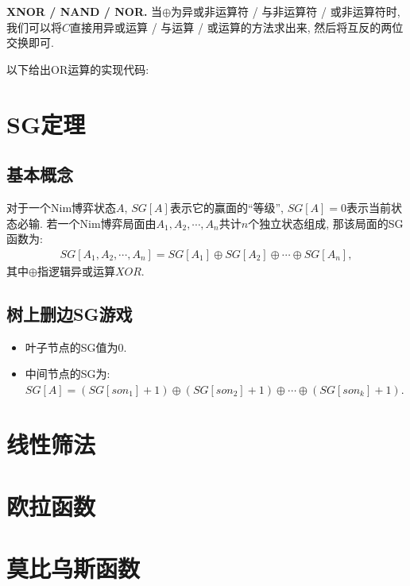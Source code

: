 \textbf{XNOR / NAND / NOR.}
当$\oplus$为异或非运算符 / 与非运算符 / 或非运算符时,我们可以将$C$直接用异或运算 / 与运算 / 或运算的方法求出来, 然后将互反的两位交换即可.

以下给出OR运算的实现代码:


\section{SG定理}

\subsection{基本概念}
对于一个Nim博弈状态$A$, $SG[A]$表示它的赢面的``等级'', $SG [A] = 0$表示当前状态必输.
若一个Nim博弈局面由$A_1, A_2, \cdots, A_n$共计$n$个独立状态组成, 那该局面的SG函数为:
\begin{gather*}
    SG[A_1,A_2,\cdots,A_n] = SG[A_1] \oplus SG[A_2] \oplus \cdots \oplus SG[A_n],
\end{gather*}
其中$\oplus$指逻辑异或运算$XOR$.



\subsection{树上删边SG游戏}
\begin{itemize}
\item
叶子节点的SG值为$0$.

\item
中间节点的SG为:
$SG[A] = (SG[son_1] + 1) \oplus (SG[son_2] + 1) \oplus \cdots \oplus (SG[son_k] + 1)$.
\end{itemize}


\section{线性筛法}


\section{欧拉函数}


\section{莫比乌斯函数}


